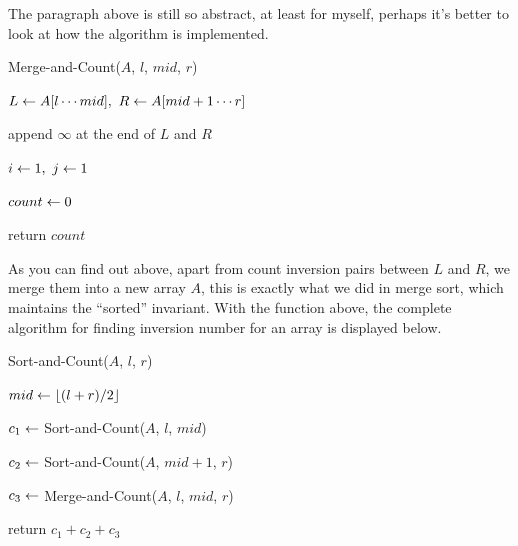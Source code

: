 \documentclass[11pt, a4paper]{COMP3711}
\begin{document}
\begin{spacing}{1.5}
    The paragraph above is still so abstract, at least for myself, 
    perhaps it's better to look at how the algorithm is implemented.\\

    \begin{algorithm}[H]
        \caption{Merge-and-Count($A$, $l$, $mid$, $r$)}


        $L\leftarrow A[l\cdots mid],\ R\leftarrow A[mid+1\cdots r]$

        append $\infty$ at the end of $L$ and $R$

        $i\leftarrow 1,\ j\leftarrow 1$ \qquad {}

        $count \leftarrow 0$  \qquad {}

        return $count$

    \end{algorithm}

    As you can find out above, apart from count inversion pairs 
    between $L$ and $R$, we merge them into a new array $A$,
    this is exactly what we did in merge sort, which maintains
    the ``sorted'' invariant. With the function above, 
    the complete algorithm for finding inversion number for an array is 
    displayed below.

    \begin{algorithm}
        \caption{Sort-and-Count($A$, $l$, $r$)}

        $mid\leftarrow \lfloor (l+r)/2\rfloor$

        $c_1\leftarrow $ Sort-and-Count($A$, $l$, $mid$)

        $c_2\leftarrow $ Sort-and-Count($A$, $mid+1$, $r$)

        $c_3\leftarrow $ Merge-and-Count($A$, $l$, $mid$, $r$)

        return $c_1+c_2+c_3$
    \end{algorithm}


\end{spacing}
\end{document}

